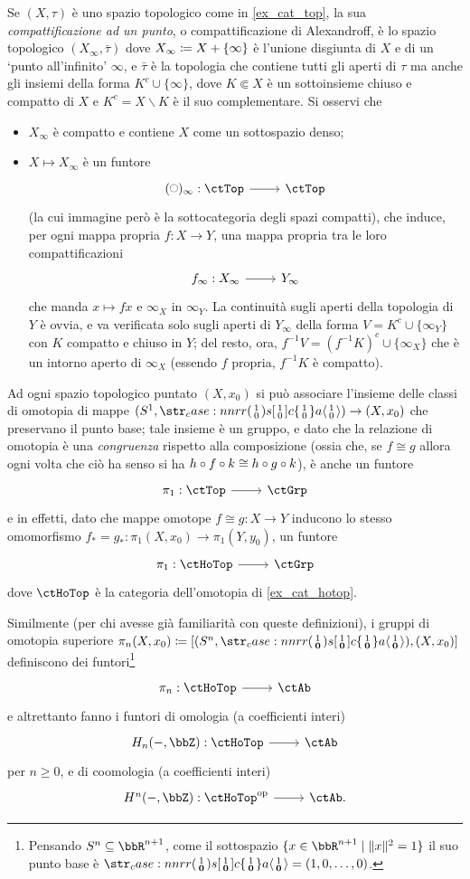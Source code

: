 \begin{example}
	Se \((X,\tau)\) è uno spazio topologico come in \ref{ex_cat_top}, la sua \emph{compattificazione ad un punto}, o compattificazione di Alexandroff, è lo spazio topologico \((X_\infty,\bar\tau)\) dove \(X_\infty \coloneqq X + \{\infty\}\) è l'unione disgiunta di \(X\) e di un `punto all'infinito' \(\infty\), e \(\bar\tau\) è la topologia che contiene tutti gli aperti di \(\tau\) ma anche gli insiemi della forma \(K^c \cup \{\infty\}\), dove \(K\Subset X\) è un sottoinsieme chiuso e compatto di \(X\) e \(K^c = X\smallsetminus K\) è il suo complementare. Si osservi che
	\begin{itemize}
		\item \(X_\infty\) è compatto e contiene \(X\) come un sottospazio denso;
		\item \(X\mapsto X_\infty\) è un funtore
		      \[\dmFun{(\blank)_\infty}\ctTop\ctTop\]
		      (la cui immagine però è la sottocategoria degli spazi compatti), che induce, per ogni mappa propria \(f : X\to Y\), una mappa propria tra le loro compattificazioni
		      \[\begin{tikzcd}
				      f_\infty : X_\infty \ar[r] & Y_\infty
			      \end{tikzcd}\]
		      che manda \(x\mapsto fx\) e \(\infty_X\) in \(\infty_Y\). La continuità sugli aperti della topologia di \(Y\) è ovvia, e va verificata solo sugli aperti di \(Y_\infty\) della forma \(V=K^c\cup\{\infty_Y\}\) con \(K\) compatto e chiuso in \(Y\); del resto, ora, \(f^{-1}V = (f^{-1}K)^c \cup \{\infty_X\}\) che è un intorno aperto di \(\infty_X\) (essendo \(f\) propria, \(f^{-1}K\) è compatto).
	\end{itemize}
\end{example}
\begin{example}\label{fun_ex_omoto_omolo}
	Ad ogni spazio topologico puntato \((X,x_0)\) si può associare l'insieme delle classi di omotopia di mappe \((S^1, \copmap[r] 10)\to (X, x_0)\) che preservano il punto base; tale insieme è un gruppo, e dato che la relazione di omotopia è una \emph{congruenza} rispetto alla composizione (ossia che, se \(f\cong g\) allora ogni volta che ciò ha senso si ha \(h\circ f\circ k\cong h\circ g\circ k\)), è anche un funtore
	\[\dmFun{\pi_1}\ctTop\ctGrp\]
	e in effetti, dato che mappe omotope \(f\cong g : X\to Y\) inducono lo stesso omomorfismo \(f_* = g_* : \pi_1(X,x_0) \to \pi_1(Y,y_0)\), un funtore
	\[\dmFun{\pi_1}\ctHoTop\ctGrp\]
	dove \(\ctHoTop\) è la categoria dell'omotopia di \ref{ex_cat_hotop}.

	Similmente (per chi avesse già familiarità con queste definizioni), i gruppi di omotopia superiore \(\pi_n(X,x_0) \defeq [(S^n,\copmap[r] 1{\mathbf{0}}), (X,x_0)]\) definiscono dei funtori\footnote{Pensando \(S^n\subseteq\bbR^{n+1}\), come il sottospazio \(\{x\in\bbR^{n+1}\mid \|x\|^2=1\}\) il suo punto base è \(\copmap[r]1{\mathbf 0}=(1,0,\dots,0)\).}
	\[\dmFun{\pi_n}\ctHoTop\ctAb\]
	e altrettanto fanno i funtori di omologia (a coefficienti interi)
	\[\dmFun{H_n(-,\bbZ)}\ctHoTop\ctAb\]
	per \(n\ge 0\), e di coomologia (a coefficienti interi)
	\[\dmFun{H^n(-,\bbZ)}{\ctHoTop^\op}{\ctAb.}\]
\end{example}
